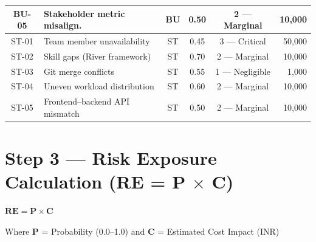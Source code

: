 \documentclass[11pt, a4paper]{article}
\begin{document}
\begin{longtable}{|c|p{4.5cm}|c|c|c|r|}
\hline
BU-05 & Stakeholder metric misalign. & BU & 0.50 & 2 --- Marginal & 10,000 \\
\hline
\rowcolor{blue!5}
ST-01 & Team member unavailability & ST & 0.45 & 3 --- Critical & 50,000 \\
\hline
ST-02 & Skill gaps (River framework) & ST & 0.70 & 2 --- Marginal & 10,000 \\
\hline
ST-03 & Git merge conflicts & ST & 0.55 & 1 --- Negligible & 1,000 \\
\hline
ST-04 & Uneven workload distribution & ST & 0.60 & 2 --- Marginal & 10,000 \\
\hline
ST-05 & Frontend--backend API mismatch & ST & 0.50 & 2 --- Marginal & 10,000 \\
\hline
\end{longtable}
\normalsize

\newpage

\section{Step 3 --- Risk Exposure Calculation (RE = P $\times$ C)}
\label{sec:exposure}

\begin{dangerbox}[Formula]
\begin{center}
{\Large $\mathbf{RE = P \times C}$}
\end{center}
Where \textbf{P} = Probability (0.0--1.0) and \textbf{C} = Estimated Cost Impact (INR)
\end{dangerbox}

\vspace{0.5em}
\end{document}
